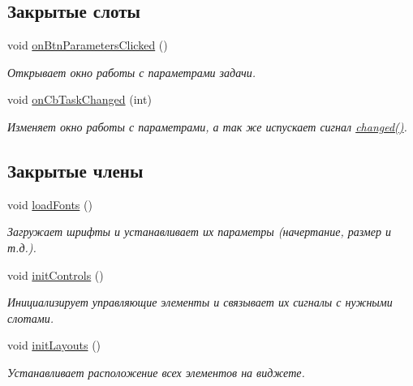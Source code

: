 \subsection*{Закрытые слоты}
\begin{DoxyCompactItemize}
\item 
\hypertarget{class_task_widget_a72a39f8729f530685d0cb2042e1dc142}{}\label{class_task_widget_a72a39f8729f530685d0cb2042e1dc142} 
void \hyperlink{class_task_widget_a72a39f8729f530685d0cb2042e1dc142}{on\+Btn\+Parameters\+Clicked} ()
\begin{DoxyCompactList}\small\item\em Открывает окно работы с параметрами задачи. \end{DoxyCompactList}\item 
\hypertarget{class_task_widget_afb4933c6c55916e161ab614c26c88975}{}\label{class_task_widget_afb4933c6c55916e161ab614c26c88975} 
void \hyperlink{class_task_widget_afb4933c6c55916e161ab614c26c88975}{on\+Cb\+Task\+Changed} (int)
\begin{DoxyCompactList}\small\item\em Изменяет окно работы с параметрами, а так же испускает сигнал \hyperlink{class_task_widget_a881ad67de3b3b2171820b7068fc97714}{changed()}. \end{DoxyCompactList}\end{DoxyCompactItemize}
\subsection*{Закрытые члены}
\begin{DoxyCompactItemize}
\item 
void \hyperlink{class_task_widget_a941ea41fcf94ff21f2b28e1ad61c8f02}{load\+Fonts} ()
\begin{DoxyCompactList}\small\item\em Загружает шрифты и устанавливает их параметры (начертание, размер и т.\+д.). \end{DoxyCompactList}\item 
\hypertarget{class_task_widget_a4611aec0bce1869e7920f5cf7d1f7ac5}{}\label{class_task_widget_a4611aec0bce1869e7920f5cf7d1f7ac5} 
void \hyperlink{class_task_widget_a4611aec0bce1869e7920f5cf7d1f7ac5}{init\+Controls} ()
\begin{DoxyCompactList}\small\item\em Инициализирует управляющие элементы и связывает их сигналы с нужными слотами. \end{DoxyCompactList}\item 
\hypertarget{class_task_widget_a99a9b36d3fc9e0d43507242f79bcccb5}{}\label{class_task_widget_a99a9b36d3fc9e0d43507242f79bcccb5} 
void \hyperlink{class_task_widget_a99a9b36d3fc9e0d43507242f79bcccb5}{init\+Layouts} ()
\begin{DoxyCompactList}\small\item\em Устанавливает расположение всех элементов на виджете. \end{DoxyCompactList}\end{DoxyCompactItemize}
